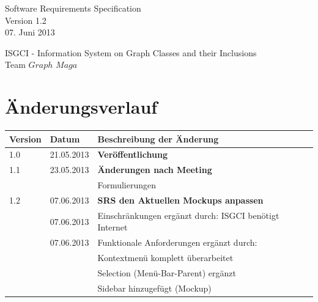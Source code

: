 \documentclass[11pt,a4paper]{article}
\begin{document}
\thispagestyle{empty} %
\vspace*{5cm} 
\begin{center}
{\huge Software Requirements Specification}\\
{\large Version 1.2}\\
{\large 07. Juni 2013}\\
\end{center}

\begin{center}
{\large ISGCI - Information System on Graph Classes and their Inclusions}\\
{\large Team $Graph$ $Maga$}
\end{center}




 
 
 
 \newpage
 
 \renewcommand{\contentsname}{Inhaltsverzeichnis}
 \tableofcontents %

\vfill 
 \section{Änderungsverlauf}

\hspace*{-1cm}
\begin{tabular}{|l|l|p{10.5cm}|}\hline
 \textbf{Version}&\textbf{Datum}&\textbf{Beschreibung der \"Anderung}\\\hline
 1.0&21.05.2013&\textbf{Veröffentlichung}\\\hline
 1.1&23.05.2013& \textbf{Änderungen nach Meeting} \\\hline
   & & Formulierungen \\\hline
 1.2& 07.06.2013 & \textbf{SRS den Aktuellen Mockups anpassen} \\\hline
 & 07.06.2013 &  Einschränkungen ergänzt durch: ISGCI benötigt Internet  \\\hline
  & 07.06.2013 &  Funktionale Anforderungen ergänzt durch:  \\\hline
   &  &  Kontextmenü komplett überarbeitet \\\hline 
    &  &  Selection (Menü-Bar-Parent) ergänzt \\\hline
     &  &  Sidebar hinzugefügt (Mockup) \\\hline
 
 
 
\end{tabular}\\
\end{document}
